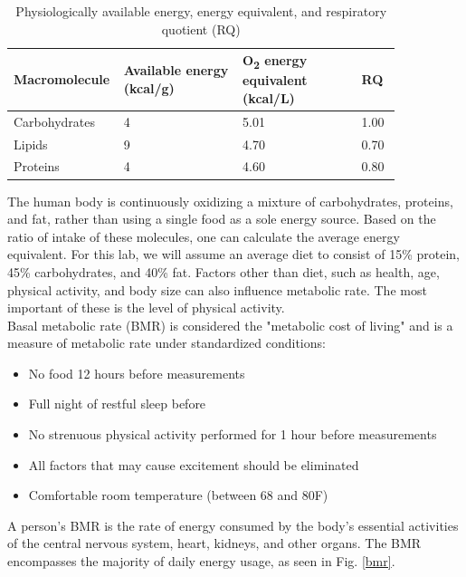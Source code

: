 \documentclass{article}
\begin{document}
\begin{table}[h]
	\centering
	\caption{Physiologically available energy, energy equivalent, and respiratory quotient (RQ)}
	\begin{tabular}[h!]{p{0.15\linewidth}|p{0.3\linewidth}p{0.3\linewidth}p{0.1\linewidth}}
	\toprule
	Macromolecule & Available energy (kcal/g) & O\textsubscript{2} energy equivalent (kcal/L) & RQ\\
	\midrule
	Carbohydrates & 4 & 5.01 & 1.00\\\midrule
	Lipids & 9 & 4.70 & 0.70\\
	\midrule
	Proteins & 4 & 4.60 & 0.80\\
	\bottomrule
	\end{tabular}
	\label{energy}
	\end{table}\vspace{1cm}

The human body is continuously oxidizing a mixture of carbohydrates, proteins, and fat, rather than using a single food as a sole energy source. Based on the ratio of intake of these molecules, one can calculate the average energy equivalent. For this lab, we will assume an average diet to consist of 15\% protein, 45\% carbohydrates, and 40\% fat. Factors other than diet, such as health, age, physical activity, and body size can also influence metabolic rate. The most important of these is the level of physical activity.\\

Basal metabolic rate (BMR) is considered the "metabolic cost of living" and is a measure of metabolic rate under standardized conditions:\begin{itemize}
	\item No food 12 hours before measurements
	\item Full night of restful sleep before
	\item No strenuous physical activity performed for 1 hour before measurements
	\item All factors that may cause excitement should be eliminated
	\item Comfortable room temperature (between 68 and 80\degree F)
\end{itemize}

A person's BMR is the rate of energy consumed by the body's essential activities of the central nervous system, heart, kidneys, and other organs. The BMR encompasses the majority of daily energy usage, as seen in Fig. \ref{bmr}.
\end{document}
